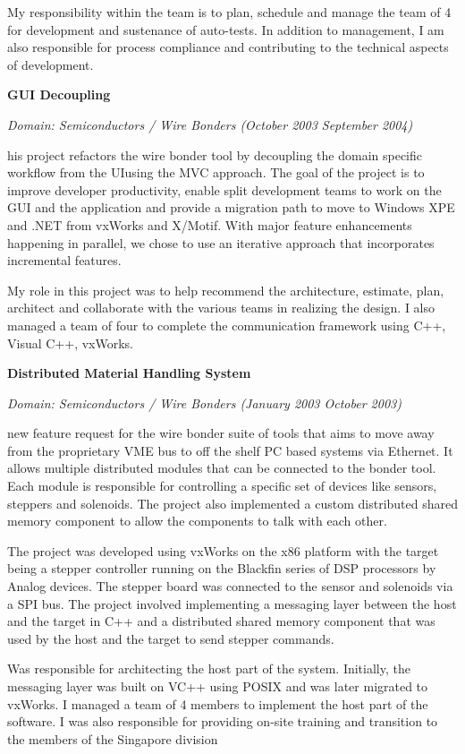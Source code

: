 \documentclass[a4paper,12pt]{article}
\newcommand\cvprojectentry[5]{
  \textbf{#1}
  
  \it{Domain: #2}\normalfont{} \quad (#3 \textendash #4)
  
}
\begin{document}
My responsibility within the team is to plan, schedule and manage the
team of 4 for development and sustenance of auto-tests. In addition
to management, I am also responsible for process compliance and
contributing to the technical aspects of development.
 
\cvprojectentry{GUI Decoupling}{Semiconductors / Wire Bonders}{October 2003}{September 2004}

This project refactors the wire bonder tool by decoupling the domain
specific workflow from the UIusing the MVC approach. The goal of the
project is to improve developer productivity, enable split development
teams to work on the GUI and the application and provide a migration
path to move to Windows XPE and .NET from vxWorks and X/Motif. With
major feature enhancements happening in parallel, we chose to use an
iterative approach that incorporates incremental features.
 
My role in this project was to help recommend the architecture,
estimate, plan, architect and collaborate with the various teams in
realizing the design. I also managed a team of four to complete the
communication framework using C++, Visual C++, vxWorks.
 
\cvprojectentry{Distributed Material Handling System}{Semiconductors / Wire Bonders}{January 2003}{October 2003}

A new feature request for the wire bonder suite of tools that aims to
move away from the proprietary VME bus to off the shelf PC based
systems via Ethernet. It allows multiple distributed modules that can
be connected to the bonder tool. Each module is responsible for
controlling a specific set of devices like sensors, steppers and
solenoids. The project also implemented a custom distributed shared
memory component to allow the components to talk with each other.
 
The project was developed using vxWorks on the x86 platform with the
target being a stepper controller running on the Blackfin series of
DSP processors by Analog devices. The stepper board was connected to
the sensor and solenoids via a SPI bus. The project involved
implementing a messaging layer between the host and the target in C++
and a distributed shared memory component that was used by the host
and the target to send stepper commands.
 
Was responsible for architecting the host part of the
system. Initially, the messaging layer was built on VC++ using POSIX
and was later migrated to vxWorks. I managed a team of 4 members to
implement the host part of the software. I was also responsible for
providing on-site training and transition to the members of the
Singapore division
\end{document}
